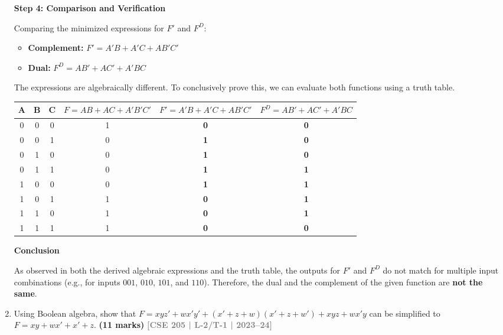 \documentclass[12pt,a3paper]{article}
\newcommand{\yr}[1]{\hfill\textcolor{gray}{\small\textbf{[#1]}}}
\newcommand{\mk}[1]{\textcolor{orange!70!black}{\small\textbf{(#1 marks)}}}
\begin{document}
\begin{enumerate}
\begin{tcolorbox}[enhanced,breakable,ansbox,colback=cA!4,colframe=cA,boxrule=0.8pt,arc=5pt,title={\textbf{Answer}},fonttitle=\bfseries\color{white},colbacktitle=cA]
\vspace{0.5cm}
\textbf{Step 4: Comparison and Verification}

Comparing the minimized expressions for $F'$ and $F^D$:
\begin{itemize}
    \item \textbf{Complement:} $F' = A'B + A'C + AB'C'$
    \item \textbf{Dual:} $F^D = AB' + AC' + A'BC$
\end{itemize}
The expressions are algebraically different. To conclusively prove this, we can evaluate both functions using a truth table.

\begin{center}
\renewcommand{\arraystretch}{1.2}
\begin{tabular}{|c|c|c||c|c|c|}
\hline
\textbf{A} & \textbf{B} & \textbf{C} & \textbf{$F = AB + AC + A'B'C'$} & \textbf{$F' = A'B + A'C + AB'C'$} & \textbf{$F^D = AB' + AC' + A'BC$} \\
\hline
0 & 0 & 0 & 1 & \textbf{0} & \textbf{0} \\
0 & 0 & 1 & 0 & \textbf{1} & \textbf{0} \\
0 & 1 & 0 & 0 & \textbf{1} & \textbf{0} \\
0 & 1 & 1 & 0 & \textbf{1} & \textbf{1} \\
1 & 0 & 0 & 0 & \textbf{1} & \textbf{1} \\
1 & 0 & 1 & 1 & \textbf{0} & \textbf{1} \\
1 & 1 & 0 & 1 & \textbf{0} & \textbf{1} \\
1 & 1 & 1 & 1 & \textbf{0} & \textbf{0} \\
\hline
\end{tabular}
\end{center}

\vspace{0.3cm}
\textbf{Conclusion}

As observed in both the derived algebraic expressions and the truth table, the outputs for $F'$ and $F^D$ do not match for multiple input combinations (e.g., for inputs $001$, $010$, $101$, and $110$). Therefore, the dual and the complement of the given function are \textbf{not the same}.
\end{tcolorbox}

\item Using Boolean algebra, show that $F = xyz' + wx'y' + (x'+z+w)(x'+z+w') + xyz + wx'y$ can be simplified to $F = xy + wx' + x' + z$.
\mk{11} \yr{CSE 205 | L-2/T-1 | 2023--24}


\end{enumerate}
\end{document}
